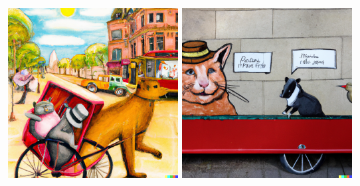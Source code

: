 \documentclass{article}
\newcommand{\imagewidthfactor}{0.4}
\begin{document}
\begin{figure}[h!]
\vspace{1.1em}
\includegraphics[width=\imagewidthfactor\textwidth]{media/5c.png}
\quad
\includegraphics[width=\imagewidthfactor\textwidth]{media/5d.png}
\end{figure}
\end{document}
